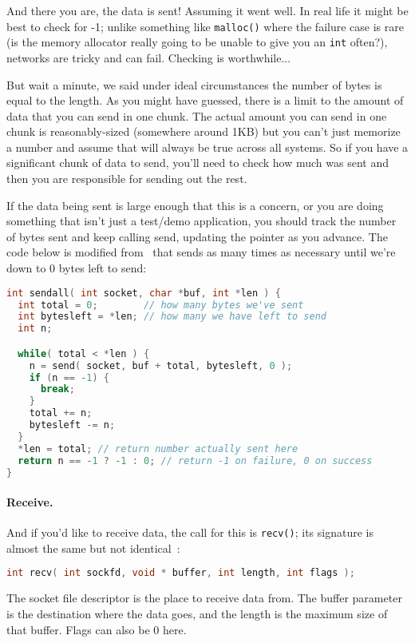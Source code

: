 And there you are, the data is sent! Assuming it went well. In real life it might be best to check for -1; unlike something like \texttt{malloc()} where the failure case is rare (is the memory allocator really going to be unable to give you an \texttt{int} often?), networks are tricky and can fail. Checking is worthwhile...

But wait a minute, we said under ideal circumstances the number of bytes is equal to the length. As you might have guessed, there is a limit to the amount of data that you can send in one chunk. The actual amount you can send in one chunk is reasonably-sized (somewhere around 1KB) but you can't just memorize a number and assume that will always be true across all systems. So if you have a significant chunk of data to send, you'll need to check how much was sent and then you are responsible for sending out the rest.

If the data being sent is large enough that this is a concern, or you are doing something that isn't just a test/demo application, you should track the number of bytes sent and keep calling send, updating the pointer as you advance. The code below is modified from~\cite{getaddrinfo} that sends as many times as necessary until we're down to 0 bytes left to send:

\begin{lstlisting}[language=C]
int sendall( int socket, char *buf, int *len ) {
  int total = 0;        // how many bytes we've sent
  int bytesleft = *len; // how many we have left to send
  int n;

  while( total < *len ) {
    n = send( socket, buf + total, bytesleft, 0 );
    if (n == -1) { 
      break; 
    }
    total += n;
    bytesleft -= n;
  }
  *len = total; // return number actually sent here
  return n == -1 ? -1 : 0; // return -1 on failure, 0 on success
}
\end{lstlisting}

\paragraph{Receive.} And if you'd like to receive data, the call for this is \texttt{recv()}; its signature is almost the same but not identical~\cite{apunix}:

\begin{lstlisting}[language=C]
int recv( int sockfd, void * buffer, int length, int flags );
\end{lstlisting}

The socket file descriptor is the place to receive data from. The buffer parameter is the destination where the data goes, and the length is the maximum size of that buffer. Flags can also be 0 here.

